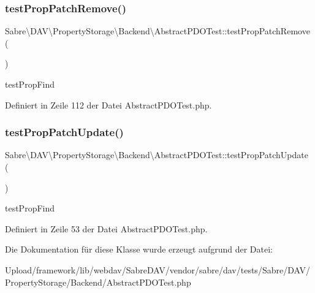 \subsubsection{\texorpdfstring{test\+Prop\+Patch\+Remove()}{testPropPatchRemove()}}
{\footnotesize\ttfamily Sabre\textbackslash{}\+D\+A\+V\textbackslash{}\+Property\+Storage\textbackslash{}\+Backend\textbackslash{}\+Abstract\+P\+D\+O\+Test\+::test\+Prop\+Patch\+Remove (\begin{DoxyParamCaption}{ }\end{DoxyParamCaption})}

test\+Prop\+Find 

Definiert in Zeile 112 der Datei Abstract\+P\+D\+O\+Test.\+php.

\mbox{\label{class_sabre_1_1_d_a_v_1_1_property_storage_1_1_backend_1_1_abstract_p_d_o_test_af8e11aa68ce02519174a497660b808ed}} 
\subsubsection{\texorpdfstring{test\+Prop\+Patch\+Update()}{testPropPatchUpdate()}}
{\footnotesize\ttfamily Sabre\textbackslash{}\+D\+A\+V\textbackslash{}\+Property\+Storage\textbackslash{}\+Backend\textbackslash{}\+Abstract\+P\+D\+O\+Test\+::test\+Prop\+Patch\+Update (\begin{DoxyParamCaption}{ }\end{DoxyParamCaption})}

test\+Prop\+Find 

Definiert in Zeile 53 der Datei Abstract\+P\+D\+O\+Test.\+php.



Die Dokumentation für diese Klasse wurde erzeugt aufgrund der Datei\+:\begin{DoxyCompactItemize}
\item 
Upload/framework/lib/webdav/\+Sabre\+D\+A\+V/vendor/sabre/dav/tests/\+Sabre/\+D\+A\+V/\+Property\+Storage/\+Backend/Abstract\+P\+D\+O\+Test.\+php\end{DoxyCompactItemize}

